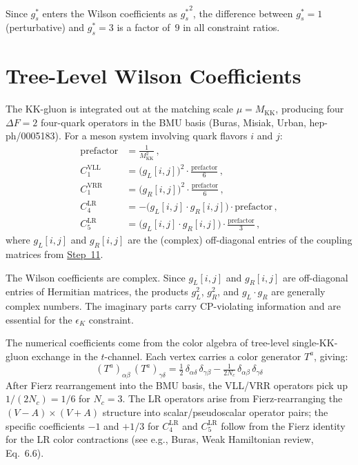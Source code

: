\documentclass[11pt]{article}
\newcommand{\Mkk}{M_{\mathrm{KK}}}
\newcommand{\gs}{g_s^*}
\begin{document}
Since $\gs$ enters the Wilson coefficients as ${\gs}^2$, the difference between
$\gs = 1$ (perturbative) and $\gs = 3$ is a factor of~$9$ in all constraint
ratios.

\section{Tree-Level Wilson Coefficients}
\label{sec:step12}

The KK-gluon is integrated out at the matching scale $\mu = \Mkk$, producing
four $\Delta F = 2$ four-quark operators in the BMU basis (Buras, Misiak,
Urban, hep-ph/0005183).  For a meson system involving quark flavors $i$ and
$j$:
\begin{align}
  \text{prefactor} &= \frac{1}{\Mkk^2}\,, \\[6pt]
  C_1^{\mathrm{VLL}} &= \bigl(g_L[i,j]\bigr)^2 \cdot
    \frac{\text{prefactor}}{6}\,, \\
  C_1^{\mathrm{VRR}} &= \bigl(g_R[i,j]\bigr)^2 \cdot
    \frac{\text{prefactor}}{6}\,, \\
  C_4^{\mathrm{LR}} &= -\bigl(g_L[i,j]\cdot g_R[i,j]\bigr) \cdot
    \text{prefactor}\,, \\
  C_5^{\mathrm{LR}} &= \bigl(g_L[i,j]\cdot g_R[i,j]\bigr) \cdot
    \frac{\text{prefactor}}{3}\,,
\end{align}
where $g_L[i,j]$ and $g_R[i,j]$ are the (complex) off-diagonal entries of the
coupling matrices from \hyperref[sec:step11]{Step~11}.

The Wilson coefficients are complex. Since $g_L[i,j]$ and $g_R[i,j]$ are
off-diagonal entries of Hermitian matrices, the products $g_L^2$, $g_R^2$, and
$g_L\cdot g_R$ are generally complex numbers. The imaginary parts carry
CP-violating information and are essential for the $\epsilon_K$ constraint.

The numerical coefficients come from the
color algebra of tree-level single-KK-gluon exchange in the $t$-channel.  Each
vertex carries a color generator $T^a$, giving:
\begin{equation}
  (T^a)_{\alpha\beta}\,(T^a)_{\gamma\delta} = \tfrac{1}{2}\,
    \delta_{\alpha\delta}\,\delta_{\gamma\beta}
    - \tfrac{1}{2N_c}\,\delta_{\alpha\beta}\,\delta_{\gamma\delta}
\end{equation}
After Fierz rearrangement into the BMU basis, the VLL/VRR operators pick up
$1/(2N_c) = 1/6$ for $N_c = 3$. The LR operators arise from
Fierz-rearranging the $(V{-}A)\times(V{+}A)$ structure into
scalar/pseudoscalar operator pairs; the specific coefficients $-1$ and $+1/3$
for $C_4^{\mathrm{LR}}$ and $C_5^{\mathrm{LR}}$ follow from the Fierz
identity for the LR color contractions (see e.g., Buras, Weak Hamiltonian
review, Eq.~6.6).
\end{document}
